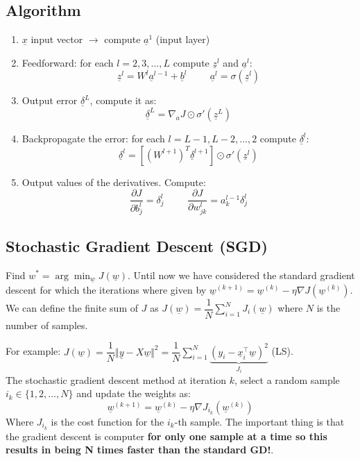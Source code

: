 \subsection{Algorithm}
\begin{enumerate}
    \item $\underline{x}$ input vector $\to$ compute $\underline{a}^1$ (input layer)
    \item Feedforward: for each $l=2,3,...,L$ compute $\underline{z}^l$ and $\underline{a}^l$:
    \[
        \underline{z}^l = W^l \underline{a}^{l-1} + \underline{b}^l \hspace{1cm} \underline{a}^l = \sigma(\underline{z}^l)     
    \] 
    \item Output error $\underline{\delta}^L$, compute it as:
    \[
        \underline{\delta}^L = \nabla_a J \odot \sigma'(\underline{z}^L)    
    \]
    \item Backpropagate the error: for each $l=L-1, L-2, ..., 2$ compute $\underline{\delta}^l$:
    \[
        \underline{\delta}^l = \left[(W^{l+1})^T \underline{\delta}^{l+1}\right] \odot \sigma'(\underline{z}^l)
    \]
    \item Output values of the derivatives. Compute:
    \[
        \dfrac{\partial J}{\partial b_j^l} = \delta_j^l \hspace{1cm} \dfrac{\partial J}{\partial w_{jk}^l} = a_k^{l-1} \delta_j^l
    \]
\end{enumerate}

\subsection{Stochastic Gradient Descent (SGD)}
Find $w^* = \arg\min_{\underline{w}} J(\underline{w})$. Until now we have considered the standard gradient descent for which the iterations where given by $\underline{w}^{(k+1)} = \underline{w}^{(k)} - \eta \nabla J(\underline{w}^{(k)})$. We can define the finite sum of $J$ as $J(\underline{w}) = \dfrac{1}{N} \sum_{i=1}^{N} J_i(\underline{w})$ where $N$ is the number of samples.

For example: $J(\underline{w}) = \dfrac{1}{N}\Vert \underline{y} - X\underline{w}\Vert^2 = \dfrac{1}{N} \sum_{i=1}^N \underbrace{\left(y_i - \underline{x}_i^\intercal \underline{w}\right)^2}_{J_i}$ (LS). \\

The stochastic gradient descent method at iteration $k$, select a random sample $i_k \in \{1,2,\dots,N\}$ and update the weights as:
\[
    \underline{w}^{(k+1)} = \underline{w}^{(k)} - \eta \nabla J_{i_k}(\underline{w}^{(k)})
\]
Where $J_{i_k}$ is the cost function for the $i_k$-th sample. The important thing is that the gradient descent is computer \textbf{for only one sample at a time so this results in being N times faster than the standard GD!}.

